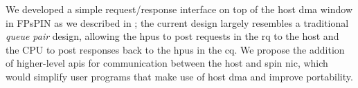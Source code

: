 We developed a simple request/response interface on top of the host \ac{dma} window in FPsPIN as we described in ; the current design largely resembles a traditional \emph{queue pair} design, allowing the \ac{hpu}s to post requests in the \ac{rq} to the host and the CPU to post responses back to the \ac{hpu}s in the \ac{cq}.  We propose the addition of higher-level \ac{api}s for communication between the host and \ac{spin} \ac{nic}, which would simplify user programs that make use of host \ac{dma} and improve portability.

\begin{comment}
\section{Packet Matching Rules}

\section{Support for Diverse Memory Architectures}
\pengxu{Corundum supports \ac{nic}-attached DDR or HBM}
\end{comment}
